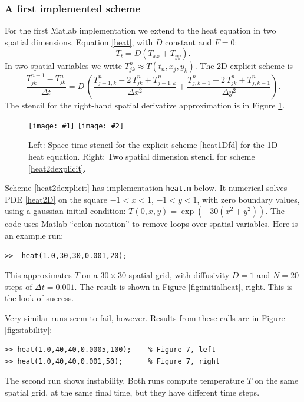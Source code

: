 \documentclass[titlepage,a4paper,final,12pt]{scrartcl}
\newcommand{\minput}[1]{
\bigskip
\begin{quote}
\bigskip
\VerbatimInput[frame=single,framesep=3mm,label=\fbox{\normalsize \textsl{\,#1.m\,}},fontfamily=courier,fontsize=\scriptsize]{../mfiles/#1.slim.m}
\bigskip
\end{quote}
}
\newcommand{\twofigsizes}[5]{
\begin{figure}[ht]
\centering
\texttt{[image: \#1]} \quad
\texttt{[image: \#2]}
\caption{#3}
\label{fig:#1}
\end{figure}}
\begin{document}
\subsubsection*{A first implemented scheme}  For the first Matlab implementation we extend to the heat equation in two spatial dimensions, Equation \eqref{heat}, with $D$ constant and $F=0$:
\begin{equation}
T_t = D (T_{xx}+T_{yy}).\label{heat2D}
\end{equation}
In two spatial variables we write $T_{jk}^n \approx T(t_n,x_j,y_k)$.  The 2D explicit scheme is
\begin{equation}
	\frac{T_{jk}^{n+1} - T_{jk}^n}{\Delta t} = D\,\left(\frac{T_{j+1,k}^n - 2\, T_{jk}^n + T_{j-1,k}^n}{\Delta x^2} + \frac{T_{j,k+1}^n - 2\, T_{jk}^n + T_{j,k-1}^n}{\Delta y^2}\right). \label{heat2dexplicit}
\end{equation}
The stencil for the right-hand spatial derivative approximation is in Figure \ref{fig:expstencil}.

\twofigsizes{expstencil}{exp2dstencil}{Left: Space-time stencil for the explicit scheme \eqref{heat1Dfd} for the 1D heat equation.  Right: Two spatial dimension stencil for scheme \eqref{heat2dexplicit}.}{2.0in}{2.1in}

Scheme \eqref{heat2dexplicit} has implementation \texttt{heat.m} below.  It numerical solves PDE \eqref{heat2D} on the square $-1 < x < 1$, $-1 < y < 1$, with zero boundary values, using a gaussian initial condition: $T(0,x,y) = \exp(-30 (x^2+y^2))$.  The code uses Matlab ``colon notation'' to remove loops over spatial variables.  Here is an example run:
\begin{Verbatim}
>>  heat(1.0,30,30,0.001,20);
\end{Verbatim}
This approximates $T$ on a $30\times 30$ spatial grid, with diffusivity $D=1$ and $N=20$ steps of $\Delta t = 0.001$.  The result is shown in Figure \ref{fig:initialheat}, right.  This is the look of success.

\minput{heat}

Very similar runs seem to fail, however.  Results from these calls are in Figure \ref{fig:stability}:
\begin{Verbatim}
>> heat(1.0,40,40,0.0005,100);    % Figure 7, left
>> heat(1.0,40,40,0.001,50);      % Figure 7, right
\end{Verbatim}
The second run shows instability.  Both runs compute temperature $T$ on the same spatial grid, at the same final time, but they have different time steps.
\end{document}
